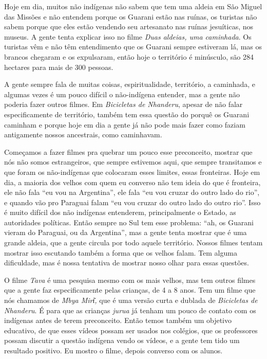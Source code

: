 Hoje em dia, muitos não indígenas não sabem que tem uma aldeia em São
Miguel das Missões e não entendem porque os Guarani estão nas ruínas, os
turistas não sabem porque que eles estão vendendo seu artesanato nas
ruínas jesuíticas, nos museus. A gente tenta explicar isso no filme
\emph{Duas aldeias, uma caminhada}. Os turistas vêm e não têm
entendimento que os Guarani sempre estiveram lá, mas os brancos chegaram
e os expulsaram, então hoje o território é minúsculo, são 284 hectares
para mais de 300 pessoas.

A gente sempre fala de muitas coisas, espiritualidade, território, a
caminhada, e algumas vezes é um pouco difícil o não-indígena entender,
mas a gente não poderia fazer outros filmes. Em \emph{Bicicletas de
Nhanderu}, apesar de não falar especificamente de território, também tem
essa questão do porquê os Guarani caminham e porque hoje em dia a gente
já não pode mais fazer como faziam antigamente nossos ancestrais, como
caminhavam.

Começamos a fazer filmes pra quebrar um pouco esse preconceito, mostrar
que nós não somos estrangeiros, que sempre estivemos aqui, que sempre
transitamos e que foram os não-indígenas que colocaram esses limites,
essas fronteiras. Hoje em dia, a maioria dos velhos com quem eu converso
não tem ideia do que é fronteira, ele não fala ``eu vou na Argentina'',
ele fala ``eu vou cruzar do outro lado do rio'', e quando vão pro
Paraguai falam ``eu vou cruzar do outro lado do outro rio''. Isso é
muito difícil dos não indígenas entenderem, principalmente o Estado, as
autoridades políticas. Então sempre no Sul tem esse problema: ``ah, os
Guarani vieram do Paraguai, ou da Argentina'', mas a gente tenta mostrar
que é uma grande aldeia, que a gente circula por todo aquele território.
Nossos filmes tentam mostrar isso escutando também a forma que os velhos
falam. Tem alguma dificuldade, mas é nossa tentativa de mostrar nosso
olhar para essas questões.

O filme \emph{Tava} é uma pesquisa mesmo com os mais velhos, mas tem
outros filmes que a gente faz especificamente pelas crianças, de 4 a 8
anos. Tem um filme que nós chamamos de \emph{Mbya Mirι}͂\emph{,} que é
uma versão curta e dublada de \emph{Bicicletas de Nhanderu}. É para que
as crianças \emph{jurua} já tenham um pouco de contato com os indígenas
antes de terem preconceito. Então temos também um objetivo educativo, de
que esses vídeos possam ser usados nos colégios, que os professores
possam discutir a questão indígena vendo os vídeos, e a gente tem tido
um resultado positivo. Eu mostro o filme, depois converso com os alunos.

